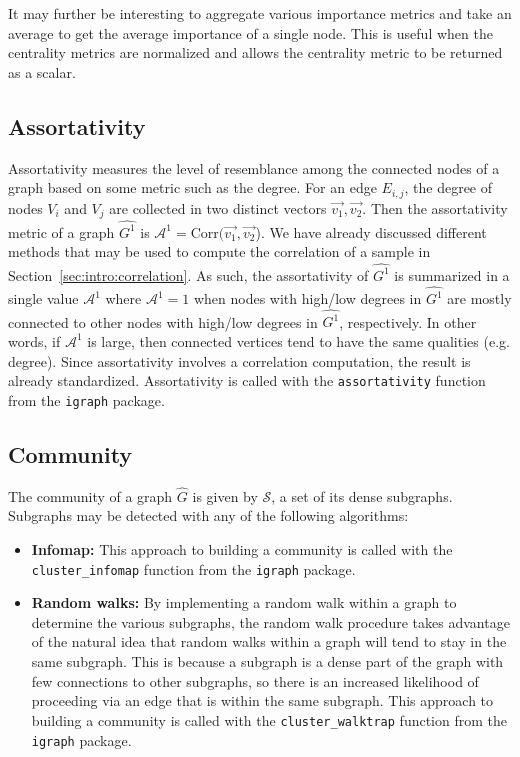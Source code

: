 It may further be interesting to aggregate various importance metrics and take 
an average to get the average importance of a single node. This is useful when 
the centrality metrics are normalized and allows the centrality metric to be 
returned as a scalar.

\subsection{Assortativity}

Assortativity measures the level of resemblance among the connected nodes of a 
graph based on some metric such as the degree. For 
an edge $E_{i,j}$, the degree of nodes $V_i$ and $V_j$ are collected in two 
distinct vectors $\overrightarrow{v_1}, \overrightarrow{v_2}$. Then the 
assortativity metric of a graph $\hat{G^1}$ is $\mathcal{A}^1 = 
\text{Corr}(\overrightarrow{v_1},\overrightarrow{v_2}$). 
We have already discussed different methods that may be used to compute 
the correlation of a sample in Section~\ref{sec:intro:correlation}. As such, 
the assortativity of $\hat{G^1}$ is summarized in a single value 
$\mathcal{A}^1$ where $\mathcal{A}^1=1$ when nodes with high/low degrees in 
$\hat{G^1}$ are mostly connected to other nodes with high/low degrees in 
$\hat{G^1}$, respectively. In other words, if $\mathcal{A}^1$ is large, then 
connected vertices tend to have the same qualities (e.g. degree). Since 
assortativity involves a correlation computation, the result is already 
standardized.
Assortativity is called with the \texttt{assortativity} function from the 
\texttt{igraph} package.

\subsection{Community}

The community of a graph $\hat{G}$ is given by $\mathcal{S}$, a set of its 
dense subgraphs. Subgraphs may be detected with any of the following algorithms:

\tablespacing
\begin{itemize}
	\item \textbf{Infomap:} 
	This approach to building a community is called with the 
	\texttt{cluster\_infomap} function from the \texttt{igraph} package.
	\item \textbf{Random walks:} By implementing a random walk within a graph 
	to determine the various subgraphs, the random walk procedure takes 
	advantage of the natural idea that random walks within a graph will tend to 
	stay in the same subgraph. This is because a subgraph is a dense part of 
	the graph with few connections to other subgraphs, so there is an 
	increased likelihood of proceeding via an edge that is within the same 
	subgraph.
	This approach to building a community is called with the 
	\texttt{cluster\_walktrap} function from the \texttt{igraph} package.
\end{itemize}
\bodyspacing

